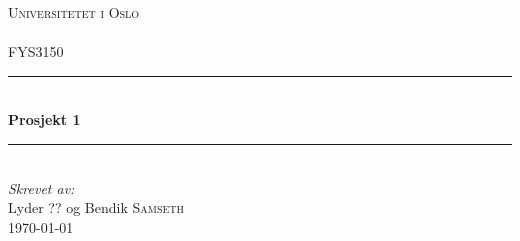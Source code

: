 \documentclass[11pt]{article}
\numberwithin{equation}{subsection} %
\numberwithin{figure}{section} %
\numberwithin{table}{section} %
\begin{document}
\begin{titlepage}
\newcommand{\HRule}{\rule{\linewidth}{0.5mm}}
\center
\textsc{\LARGE Universitetet i Oslo}\\[1.5cm] %
\textsc{\Large }\\[0.5cm] %
\textsc{\large FYS3150}\\[0.5cm] %
\HRule \\[0.4cm]
{ \huge \bfseries Prosjekt 1 }\\[0.4cm] %
\HRule \\[1.5cm]
\Large \emph{Skrevet av:}\\
Lyder \textsc{??} og Bendik \textsc{Samseth}\\[3cm]
{\large \today}\\[3cm]
\vfill
\end{titlepage}
\end{document}
